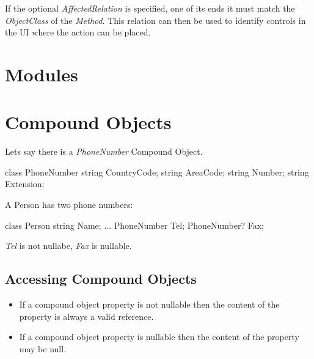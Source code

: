 If the optional \emph{AffectedRelation} is specified, one of its ends it
must match the \emph{ObjectClass} of the \emph{Method}. This relation
can then be used to identify controls in the UI where the action can be
placed.

\section{Modules}

\section{Compound Objects}
Lets say there is a \emph{PhoneNumber} Compound Object.
\begin{CS}
class PhoneNumber
{
	string CountryCode;
	string AreaCode;
	string Number;
	string Extension;
}
\end{CS}

A Person has two phone numbers:

\begin{CS}
class Person
{
	string Name;
	...
	PhoneNumber  Tel;
	PhoneNumber? Fax;
}
\end{CS}
\emph{Tel} is not nullabe, \emph{Fax} is nullable.

\subsection{Accessing Compound Objects}

\begin{itemize}
	\item{If a compound object property is not nullable then the content of the property is always a valid reference.}
	\item{If a compound object property is  nullable then the content of the property may be null.}
\end{itemize}

